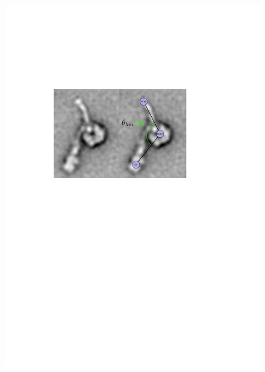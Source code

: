 \documentclass[9pt,twocolumn,twoside,lineno]{pnas-new}
\begin{document}
\begin{figure}
\begin{minipage}{0.5\textwidth}
   \includegraphics[width=\linewidth]{figures/schematic-poststroke}
   \label{fig:poststrokeangle}
 \end{minipage}
 \begin{minipage}{\textwidth}
   \centering

\end{minipage}
\end{figure}
\end{document}
